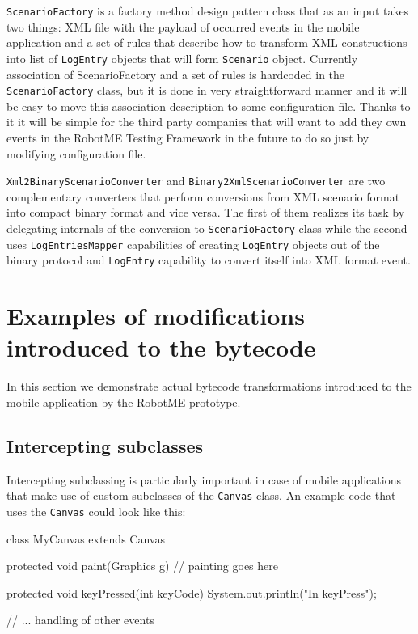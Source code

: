 \texttt{ScenarioFactory} is a factory method design pattern class that as an input takes two things:
XML file with the payload of occurred events in the mobile application
and a set of rules that describe how to transform XML constructions
into list of \texttt{LogEntry} objects that will form \texttt{Scenario} object. Currently association
of ScenarioFactory and a set of rules is hardcoded in the \texttt{ScenarioFactory} class, but it is
done in very straightforward manner and it will be easy to move this association
description to some configuration file. Thanks to it it will be simple
for the third party companies that will want to add they own events in the RobotME Testing Framework
in the future to do so just by modifying configuration file.

\texttt{Xml2BinaryScenarioConverter} and \texttt{Binary2XmlScenarioConverter} are two complementary 
converters that perform conversions from XML scenario format into
compact binary format and vice versa. The first of them realizes its task
by delegating internals of the conversion to \texttt{ScenarioFactory} class
while the second uses \texttt{LogEntriesMapper} capabilities of creating
\texttt{LogEntry} objects out of the binary protocol and \texttt{LogEntry} capability
to convert itself into XML format event.


\section{Examples of modifications introduced to the bytecode}

In this section we demonstrate actual bytecode transformations introduced to the
mobile application by the RobotME prototype.

\subsection{Intercepting subclasses}

Intercepting subclassing is particularly important in case of  mobile applications that 
make use of custom subclasses of the \texttt{Canvas} class. An example code that
uses the \texttt{Canvas} could look like this:

\begin{javablock}
class MyCanvas extends Canvas {

	protected void paint(Graphics g) {
        // painting goes here
	}

	protected void keyPressed(int keyCode) {
		System.out.println("In keyPress");
	}

    // ... handling of other events
}
\end{javablock}

